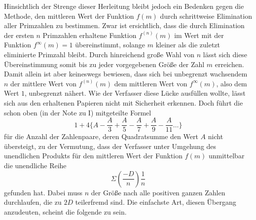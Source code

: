 Hinsichtlich der Strenge dieser Herleitung bleibt jedoch ein Bedenken gegen die Methode, den mittleren Wert der Funktion $f(m)$ durch schrittweise Elimination aller Primzahlen zu bestimmen. Zwar ist ersichtlich, dass die durch Elimination der ersten $n$ Primzahlen erhaltene Funktion $f^{(n)}(m)$ im Wert mit der Funktion $f^\infty(m)=1$ übereinstimmt, solange $m$ kleiner als die zuletzt eliminierte Primzahl bleibt. Durch hinreichend große Wahl von $n$ lässt sich diese Übereinstimmung somit bis zu jeder vorgegebenen Größe der Zahl $m$ erreichen. Damit allein ist aber keineswegs bewiesen, dass sich bei unbegrenzt wachsendem $n$ der mittlere Wert von $f^{(n)}(m)$ dem mittleren Wert von $f^\infty(m)$, also dem Wert $1$, unbegrenzt nähert. Wie der Verfasser diese Lücke ausfüllen wollte, lässt sich aus den erhaltenen Papieren nicht mit Sicherheit erkennen. Doch führt die schon oben (in der Note zu I) mitgeteilte Formel
\[
1+4\{A-\frac A3+\frac A5-\frac A7+\frac A9-\frac A{11}\ldots\}
\]
für die Anzahl der Zahlenpaare, deren Quadratsumme den Wert $A$ nicht übersteigt, zu der Vermutung, dass der Verfasser unter Umgehung des unendlichen Produkts für den mittleren Wert der Funktion $f(m)$ unmittelbar die unendliche Reihe
\[
\Sigma\left(\frac{-D}n\right)\frac1n
\]
gefunden hat. Dabei muss $n$ der Größe nach alle positiven ganzen Zahlen durchlaufen, die zu $2D$ teilerfremd sind. Die einfachste Art, diesen Übergang anzudeuten, scheint die folgende zu sein.

